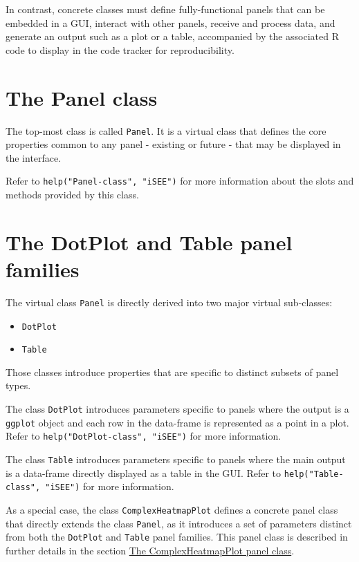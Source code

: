 \documentclass[]{book}
\providecommand{\tightlist}{%
  \setlength{\itemsep}{0pt}\setlength{\parskip}{0pt}}
\begin{document}
In contrast, concrete classes must define fully-functional panels that
can be embedded in a GUI, interact with other panels, receive and
process data, and generate an output such as a plot or a table,
accompanied by the associated R code to display in the code tracker for
reproducibility.

\section{The Panel class}\label{the-panel-class}

The top-most class is called \texttt{Panel}. It is a virtual class that
defines the core properties common to any panel - existing or future -
that may be displayed in the interface.

Refer to \texttt{help("Panel-class",\ "iSEE")} for more information
about the slots and methods provided by this class.

\section{The DotPlot and Table panel
families}\label{the-dotplot-and-table-panel-families}

The virtual class \texttt{Panel} is directly derived into two major
virtual sub-classes:

\begin{itemize}
\tightlist
\item
  \texttt{DotPlot}
\item
  \texttt{Table}
\end{itemize}

Those classes introduce properties that are specific to distinct subsets
of panel types.

The class \texttt{DotPlot} introduces parameters specific to panels
where the output is a \texttt{ggplot} object and each row in the
data-frame is represented as a point in a plot. Refer to
\texttt{help("DotPlot-class",\ "iSEE")} for more information.

The class \texttt{Table} introduces parameters specific to panels where
the main output is a data-frame directly displayed as a table in the
GUI. Refer to \texttt{help("Table-class",\ "iSEE")} for more
information.

As a special case, the class \texttt{ComplexHeatmapPlot} defines a
concrete panel class that directly extends the class \texttt{Panel}, as
it introduces a set of parameters distinct from both the
\texttt{DotPlot} and \texttt{Table} panel families. This panel class is
described in further details in the section
\protect\hyperlink{complexheatmapplot-class}{The ComplexHeatmapPlot
panel class}.
\end{document}
